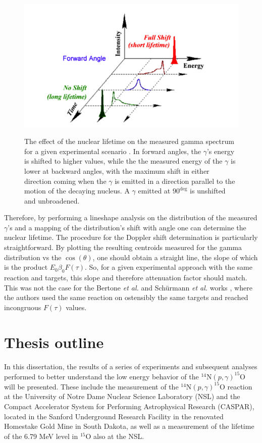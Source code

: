 \begin{figure}
\includegraphics[width=\linewidth]{figures/dopplerEffects.png}
\label{fig: dopplerShift}
\caption{The effect of the nuclear lifetime on the measured gamma spectrum for a given experimental scenario \cite{Schimpf2011}. In forward angles, the $\gamma$'s energy is shifted to higher values, while the the measured energy of the $\gamma$ is lower at backward angles, with the maximum shift in either direction coming when the $\gamma$ is emitted in a direction parallel to the motion of the decaying nucleus. A $\gamma$ emitted at $90^{\deg}$ is unshifted and unbroadened. }
\end{figure}

Therefore, by performing a lineshape analysis on the distribution of the measured $\gamma$'s and a mapping of the distribution's shift with angle one can determine the nuclear lifetime. The procedure for the Doppler shift determination is particularly straightforward. By plotting the resulting centroids measured for the gamma distribution vs the $\cos(\theta)$, one should obtain a straight line, the slope of which is the product $E_{0} \beta_{0} F(\tau)$. So, for a given experimental approach with the same reaction and targets, this slope and therefore attenuation factor should match. This was not the case for the Bertone \textit{et al.} and Sch{\"u}rmann \textit{et al.} works \cite{Bertone2001, Schurmann2008}, where the authors used the same reaction on ostensibly the same targets and reached incongruous $F(\tau)$ values. 
 

\section{Thesis outline}
\label{sec: thesis outline}

In this dissertation, the results of a series of experiments and subsequent analyses performed to better understand the low energy behavior of the $^{14}$N$\left( p,\gamma \right) ^{15}$O will be presented. These include the measurement of the $^{14}$N$\left( p,\gamma \right) ^{15}$O reaction at the University of Notre Dame Nuclear Science Laboratory (NSL) and the Compact Accelerator System for Performing Astrophysical Research (CASPAR), located in the Sanford Underground Research Facility in the renovated Homestake Gold Mine in South Dakota, as well as a measurement of the lifetime of the 6.79 MeV level in $^{15}$O also at the NSL. 

